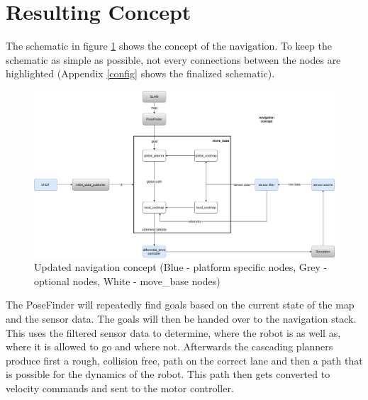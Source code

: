 \section{Resulting Concept}
The schematic in figure \ref{navconcept} shows the concept of the navigation.  To keep the schematic as simple as possible, not every connections between the nodes are highlighted (Appendix \ref{config} shows the finalized schematic).\\
\begin{figure}[H]
	\begin{center}
		\includegraphics[width=140mm]{Pictures/Updated navigation concept}
		\caption[updated navigation concept]{Updated navigation concept (Blue - platform specific nodes, Grey - optional nodes, White - move\_base nodes)}
		\label{navconcept}
	\end{center}
\end{figure}



The PoseFinder will repeatedly find goals based on the current state of the map and the sensor data. The goals will then be handed over to the navigation stack. This uses the filtered sensor data to determine, where the robot is as well as, where it is allowed to go and where not. Afterwards the cascading planners produce first a rough, collision free, path on the correct lane and then a path that is possible for the dynamics of the robot. This path then gets converted to velocity commands and sent to the motor controller.\\




